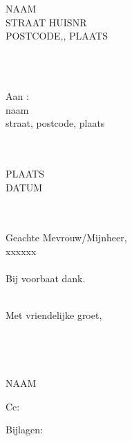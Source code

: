\documentclass[a4paper,12pt]{article}
\begin{document}
\setlength{\parindent}{0em}
\pagestyle{empty}
\hfill
\begin{minipage}{0.3\textwidth}
NAAM \\ STRAAT HUISNR \\ POSTCODE,, PLAATS
\end{minipage}
~\\~\\

\begin{minipage}{0.9\textwidth}
Aan : 
\\ naam \\ straat, postcode, plaats
~\\~\\~\\
\end{minipage}

\hfill
\begin{minipage}{0.3\textwidth}
PLAATS \\ DATUM
\end{minipage}
~\\~\\

Geachte Mevrouw/Mijnheer,
~\\

xxxxxx
~\\~\\

Bij voorbaat dank.
~\\~\\

\hspace*{0.3\textwidth}
\begin{minipage}{0.5\textwidth}
Met vriendelijke groet,
~\\~\\~\\~\\~\\
NAAM
\end{minipage}

\vfill
\begin{minipage}{0.8\textwidth}
Cc: 
\end{minipage}

\begin{minipage}{0.8\textwidth}
Bijlagen: 
\end{minipage}

\end{document}
